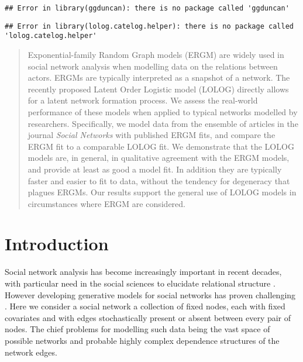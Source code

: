 \documentclass[
]{statsoc}
\author{}
\date{\vspace{-2.5em}}
\begin{document}
\newcommand{\R}{\mathbb{R}}
\newcommand{\N}{\mathbb{N}}
\newcommand{\E}{\mathbb{E}}
\newcommand{\V}{\mathbb{V}}
\newcommand{\bfR}{\mathbf{R}}
\newcommand{\bfX}{\mathbf{X}}
\newcommand{\bfW}{\mathbf{W}}
\newcommand{\bfD}{\mathbf{D}}
\newcommand{\INT}{\int_{-\infty}^{+\infty}}
\newcommand{\p}{\partial}
\newcommand{\ra}{\Rightarrow}
\newcommand{\dH}{d\mathscr{H}}
\newcommand{\ch}{\text{cosh}}
\newcommand{\sh}{\text{sinh}}
\newcommand{\ex}{\mathbb{E}\left[X\right]}
\newcommand{\ey}{\mathbb{E}\left[Y\right]}
\newcommand{\logit}{{\rm logit}}
\newcommand{\MOM}{{\rm MOM}}

\begin{verbatim}
## Error in library(ggduncan): there is no package called 'ggduncan'
\end{verbatim}

\begin{verbatim}
## Error in library(lolog.catelog.helper): there is no package called 'lolog.catelog.helper'
\end{verbatim}

\setcounter{secnumdepth}{4}

\begin{abstract}
Exponential-family Random Graph models (ERGM) are widely used in social network analysis when modelling data on the relations between actors. ERGMs are typically interpreted as a snapshot of a network. The recently proposed Latent Order Logistic model (LOLOG) directly allows for a latent network formation process. We assess the real-world performance of these models when applied to typical networks modelled by researchers. Specifically, 
we model data from the ensemble of articles in the journal \textit{Social Networks} with published ERGM fits, and compare the ERGM fit to a comparable LOLOG fit. We demonstrate that the LOLOG models are, in general, in qualitative agreement with the ERGM models, and provide at least as good a model fit. In addition they are typically faster and easier to fit to data, without the tendency for degeneracy that plagues ERGMs.
Our results support the general use of LOLOG models in circumstances where ERGM are considered.
\end{abstract}

\section{Introduction}

Social network analysis has become increasingly important in recent
decades, with particular need in the social sciences to elucidate
relational structure \citep{Goldenberg2010}. However developing
generative models for social networks has proven challenging
\citep{chatterjee2013}. Here we consider a social network a collection
of fixed nodes, each with fixed covariates and with edges stochastically
present or absent between every pair of nodes. The chief problems for
modelling such data being the vast space of possible networks and
probable highly complex dependence structures of the network edges.
\end{document}
